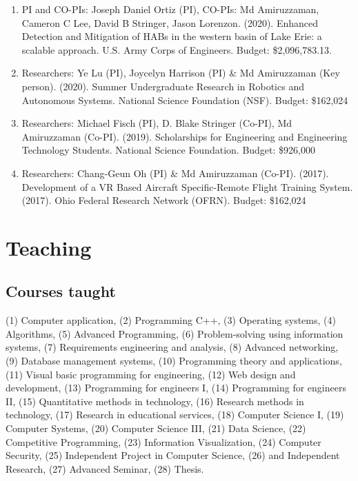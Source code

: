 \documentclass{article}
\begin{document}
\begin{enumerate}[topsep=0pt,itemsep=-1ex,partopsep=0ex,parsep=1ex]
    \item PI and CO-PIs: Joseph Daniel Ortiz (PI), CO-PIs: Md Amiruzzaman, Cameron C Lee, David B Stringer, Jason Lorenzon. (2020). Enhanced Detection and Mitigation of HABs in the western basin of Lake Erie: a scalable approach. U.S. Army Corps of Engineers. Budget: \$2,096,783.13.  
    \item Researchers: Ye Lu (PI), Joycelyn Harrison (PI) \& Md Amiruzzaman (Key person). (2020). Summer Undergraduate Research in Robotics and Autonomous Systems.  National Science Foundation (NSF). Budget: \$162,024
    \item Researchers: Michael Fisch (PI), D. Blake Stringer (Co-PI), Md Amiruzzaman (Co-PI). (2019). Scholarships for Engineering and Engineering Technology Students. National Science Foundation. Budget: \$926,000
    \item Researchers: Chang-Geun Oh (PI) \& Md Amiruzzaman (Co-PI). (2017). Development of a VR Based Aircraft Specific-Remote Flight Training System. (2017).  Ohio Federal Research Network (OFRN). Budget: \$162,024
\end{enumerate}

% 
\vspace{-1em}
\section*{Teaching}\vspace{-0.5em}
\subsection*{Courses taught}\vspace{-0.5em}
\begin{adjustwidth}{1cm}{}
(1) Computer application, (2) Programming C++, (3) Operating systems, (4) Algorithms, (5) Advanced Programming, (6) Problem-solving using information systems, (7) Requirements engineering and analysis, (8) Advanced networking, (9) Database management systems, (10) Programming theory and applications, (11) Visual basic programming for engineering, (12) Web design and development, (13) Programming for engineers I, (14) Programming for engineers II, (15) Quantitative methods in technology, (16) Research methods in technology, (17) Research in educational services, (18) Computer Science I, (19) Computer Systems, (20) Computer Science III, (21) Data Science, (22) Competitive Programming, (23) Information Visualization, (24) Computer Security, (25) Independent Project in Computer Science, (26) and Independent Research, (27) Advanced Seminar, (28) Thesis.
\end{adjustwidth}
\end{document}
